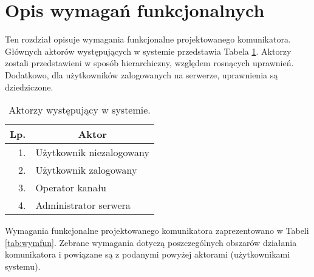 \section{Opis wymagań funkcjonalnych}
Ten rozdział opisuje wymagania funkcjonalne projektowanego komunikatora. Głównych
aktorów występujących w systemie przedstawia Tabela \ref{tab:aktorzy}. Aktorzy
zostali przedstawieni w sposób hierarchiczny, względem rosnących uprawnień.
Dodatkowo, dla użytkowników zalogowanych na serwerze, uprawnienia są dziedziczone.

\begin{table}[!hbp]
	\centering
	\caption{Aktorzy występujący w systemie.}
	\label{tab:aktorzy}
	\begin{tabular}{|r|l|} \hline
		\multicolumn{1}{|c|}{\textbf{Lp.}} & \multicolumn{1}{|c|}{\textbf{Aktor}} \\ \hline
		1. & Użytkownik niezalogowany \\ \hline \hline
		2. & Użytkownik zalogowany \\ \hline
		3. & Operator kanału \\ \hline
		4. & Administrator serwera \\ \hline
	\end{tabular}
\end{table}

Wymagania funkcjonalne projektowanego komunikatora zaprezentowano w Tabeli
\ref{tab:wymfun}. Zebrane wymagania dotyczą poszczególnych obszarów działania
komunikatora i powiązane są z podanymi powyżej aktorami (użytkownikami systemu).

